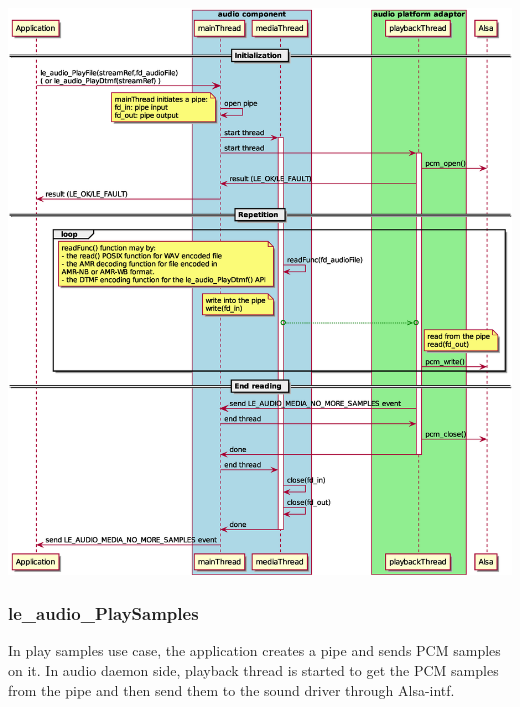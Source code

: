 \begin{DoxyImageNoCaption}
  \mbox{\includegraphics[width=\textwidth,height=\textheight/2,keepaspectratio=true]{le_audio_PlayFile}}
\end{DoxyImageNoCaption}
\hypertarget{c_SDD_audio_le_audio_PlaySamples}{}\subsubsection{le\+\_\+audio\+\_\+\+Play\+Samples}\label{c_SDD_audio_le_audio_PlaySamples}
In play samples use case, the application creates a pipe and sends P\+CM samples on it. In audio daemon side, playback thread is started to get the P\+CM samples from the pipe and then send them to the sound driver through Alsa-\/intf.


